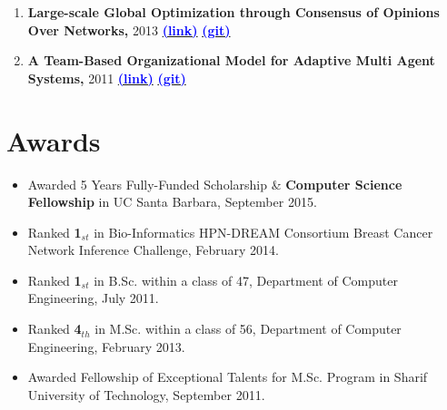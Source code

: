\documentclass[letter]{res}
\begin{document}
\begin{resume}
\begin{enumerate}
\item \textbf{Large-scale Global Optimization through Consensus of Opinions Over Networks,} 2013 {\href{http://www.casmodeling.com/content/1/1/11}{\textbf{\textcolor{blue}{(link)}}}}
{\href{https://github.com/omid55/optimization_opinion_formation}{\textbf{\textcolor{blue}{(git)}}}}


\item \textbf{A Team-Based Organizational Model for Adaptive Multi Agent Systems,} 2011
{\href{https://www.researchgate.net/publication/221539731_A_Team-based_Organizational_Model_for_Adaptive_Multi-agent_Systems}{\textbf{\textcolor{blue}{(link)}}}}
{\href{https://github.com/omid55/team_based_rescue_jade_multi_agent_system}{\textbf{\textcolor{blue}{(git)}}}}

\end{enumerate}


\section{Awards} 
 \begin{itemize}
 \item Awarded 5 Years Fully-Funded Scholarship \& \textbf{Computer Science Fellowship} in UC Santa Barbara, September 2015.
 \item Ranked \textbf{1}$_{st}$ in Bio-Informatics HPN-DREAM Consortium Breast Cancer Network Inference Challenge, February 2014.
 \item Ranked \textbf{1}$_{st}$ in B.Sc. within a class of 47, Department of Computer Engineering, July 2011.
 \item Ranked \textbf{4}$_{th}$ in M.Sc. within a class of 56, Department of Computer Engineering, February 2013.
 \item Awarded Fellowship of Exceptional Talents for M.Sc. Program in Sharif University of Technology, September 2011.
\end{itemize}



\end{resume}
\end{document}
